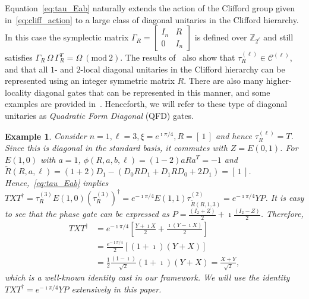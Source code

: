 \documentclass[twoside,romanappendices]{IEEEtran}
\newtheorem{example}{Example}
\newcommand{\vecnot}[1]{\underline{#1}}
\newcommand{\MZ}{\mathbb{Z}}
\begin{document}
Equation~\eqref{eq:tau_Eab} naturally extends the action of the Clifford group given in~\eqref{eq:cliff_action} to a large class of diagonal unitaries in the Clifford hierarchy.
In this case the symplectic matrix
$\Gamma_R = \begin{bmatrix}
I_n & R \\
0 & I_n
\end{bmatrix}$ is defined over $\MZ_{2^{\ell}}$ and still satisfies $\Gamma_R\, \Omega\, \Gamma_R^T = \Omega\ (\text{mod}\ 2)$.
The results of~\cite{Rengaswamy-pra19} also show that $\tau_R^{(\ell)} \in \mathcal{C}^{(\ell)}$, and that all $1$- and $2$-local diagonal unitaries in the Clifford hierarchy can be represented using an integer symmetric matrix $R$.
There are also many higher-locality diagonal gates that can be represented in this manner, and some examples are provided in~\cite{Rengaswamy-pra19}.
Henceforth, we will refer to these type of diagonal unitaries as \emph{Quadratic Form Diagonal} (QFD) gates.


\begin{example}
\label{eg:T_gate}
\normalfont
Consider $n = 1, \ell = 3, \xi = e^{\imath\pi/4}, R = [\, 1 \, ]$ and hence $\tau_R^{(\ell)} = T$.
Since this is diagonal in the standard basis, it commutes with $Z = E(0,1)$.
For $E(1,0)$ with $a = 1$, $\phi(R,a,b,\ell) = (1 - 2) aRa^T = -1$ and $\tilde{R}(R,a,\ell) = (1 + 2) D_1 - (D_0 R D_1 + D_1 R D_0 + 2 D_1) = [\, 1 \, ]$.
Hence,~\eqref{eq:tau_Eab} implies $TXT^{\dagger} = \tau_R^{(3)} E(1,0) (\tau_R^{(3)})^{\dagger} = e^{-\imath\pi/4} E(1,1) \tau_{\tilde{R}(R,1,3)}^{(2)} = e^{-\imath\pi/4} Y P$.
It is easy to see that the phase gate can be expressed as $P = \frac{(I_2 + Z)}{2} + \imath \frac{(I_2 - Z)}{2}$.
Therefore,
\begin{align}
TXT^{\dagger} & = e^{-\imath\pi/4} \left[ \frac{Y + \imath X}{2} + \frac{\imath(Y - \imath X)}{2} \right] \nonumber \\
%
  & = \frac{e^{-\imath\pi/4}}{2} \left[ (1 + \imath) (Y + X) \right] \nonumber \\
%
  & = \frac{1}{2} \frac{(1 - \imath)}{\sqrt{2}} (1 + \imath) (Y + X) = \frac{X + Y}{\sqrt{2}},
\end{align}
which is a well-known identity cast in our framework.
We will use the identity $TXT^{\dagger} = e^{-\imath\pi/4} Y P$ extensively in this paper.
\end{example}
\end{document}
